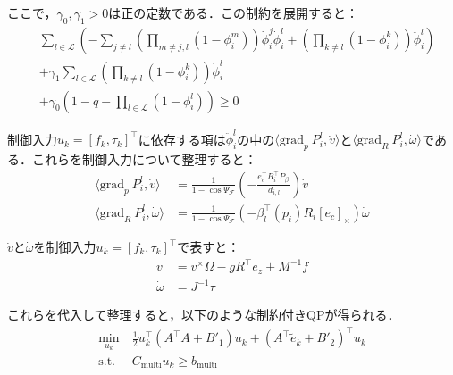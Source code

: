 ここで，$\gamma_0, \gamma_1 > 0$は正の定数である．この制約を展開すると：
\begin{equation}
\begin{aligned}
&\sum_{l \in \mathcal{L}} \left( -\sum_{j \neq l} \left( \prod_{m \neq j, l} (1 - \phi_{i}^m) \right) \dot{\phi}_i^j \dot{\phi}^l_{i} + \left( \prod_{k \neq l} (1 - \phi_{i}^k) \right) \ddot{\phi}^l_{i} \right) \\
&+ \gamma_1 \sum_{l \in \mathcal{L}} \left( \prod_{k \neq l} (1 - \phi_{i}^k) \right) \dot{\phi}^l_{i} \\
&+ \gamma_0 (1 - q - \prod_{l \in \mathcal{L}} (1 - \phi_{i}^l)) \geq 0
\label{eq:hocbf_constraint_multi_expanded}
\end{aligned}
\end{equation}

制御入力$u_k = [f_k, \tau_k]^\top$に依存する項は$\ddot{\phi}^l_{i}$の中の$\langle \mathrm{grad}_p\:P_i^l, \dot{v} \rangle$と$\langle \mathrm{grad}_R\:P_i^l, \dot{\omega} \rangle$である．これらを制御入力について整理すると：
\begin{equation}
\begin{aligned}
\langle \mathrm{grad}_p\:P_i^l, \dot{v} \rangle &= \frac{1}{1 - \cos \Psi_\mathcal{F}} \left( -\frac{e_c^\top R_i^\top P_{\beta_l}}{d_{i,l}} \right) \dot{v} \\
\langle \mathrm{grad}_R\:P_i^l, \dot{\omega} \rangle &= \frac{1}{1 - \cos \Psi_\mathcal{F}} (-\beta_l^\top(p_i) R_i [e_c]_\times) \dot{\omega}
\label{eq:grad_dot_v_omega}
\end{aligned}
\end{equation}

$\dot{v}$と$\dot{\omega}$を制御入力$u_k = [f_k, \tau_k]^\top$で表すと：
\begin{equation}
\begin{aligned}
\dot{v} &= v^\times \Omega - g R^\top e_z + M^{-1} f \\
\dot{\omega} &= J^{-1} \tau
\label{eq:acceleration_control_multi}
\end{aligned}
\end{equation}

これらを代入して整理すると，以下のような制約付きQPが得られる．
\begin{equation}
\begin{aligned}
\min_{u_k} &\: \frac{1}{2} u_k^\top (A^\top A + B'_1) u_k + (A^\top \tilde{e}_k + B'_2)^\top u_k \\
\mathrm{s.t.} &\: C_{\mathrm{multi}} u_k \geq b_{\mathrm{multi}}
\label{eq:hocbf_qp_multi}
\end{aligned}
\end{equation}


